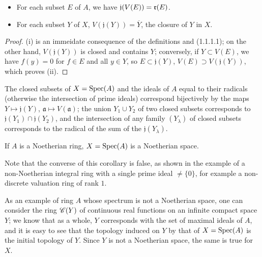\begin{prop}[1.1.4]
\label{prop-1.1.1.4}
\medskip\noindent
\begin{itemize}
  \item[{\rm(i)}] For each subset $E$ of $A$, we have $\mathfrak{j}(V(E))=\mathfrak{r}(E)$.
  \item[{\rm(ii)}] For each subset $Y$ of $X$, $V(\mathfrak{j}(Y))=\overline{Y}$, the closure of $Y$
        in $X$.
\end{itemize}
\end{prop}

\begin{proof}
\label{proof-prop-1.1.1.4}
(i) is an immeidate consequence of the definitions and (1.1.1.1); on the other hand,
$V(\mathfrak{j}(Y))$ is closed and contains $Y$; conversely, if $Y\subset V(E)$, we have
$f(y)=0$ for $f\in E$ and all $y\in Y$, so $E\subset\mathfrak{j}(Y)$,
$V(E)\supset V(\mathfrak{j}(Y))$, which proves (ii).
\end{proof}

\begin{cor}[1.1.5]
\label{cor-1.1.1.5}
The closed subsets of $X={\mathop{\mathrm{Spec}}\nolimits}(A)$ and the ideals of $A$ equal to their radicals (otherwise
the intersection of prime ideals) correspond bijectively by the  maps
$Y\mapsto\mathfrak{j}(Y)$, $\mathfrak{a}\mapsto V(\mathfrak{a})$; the union $Y_1\cup Y_2$ of
two closed subsets corresponds to $\mathfrak{j}(Y_1)\cap\mathfrak{j}(Y_2)$, and the
intersection of any family $(Y_\lambda)$ of closed subsets corresponds to the radical of the
sum of the $\mathfrak{j}(Y_\lambda)$.
\end{cor}

\begin{cor}[1.1.6]
\label{cor-1.1.1.6}
If $A$ is a Noetherian ring, $X={\mathop{\mathrm{Spec}}\nolimits}(A)$ is a Noetherian space.
\end{cor}

Note that the converse of this corollary is false, as shown
in the example of a non-Noetherian integral ring with a single prime ideal $\neq\{0\}$, for
example a non-discrete valuation ring of rank $1$.

As an example of ring $A$ whose spectrum is not a Noetherian space, one can consider the ring
$\mathscr{C}(Y)$ of continuous real functions on an infinite compact space $Y$; we know that as a
whole, $Y$ corresponds with the set of maximal ideals of $A$, and it is easy to see that the
topology induced on $Y$ by that of $X={\mathop{\mathrm{Spec}}\nolimits}(A)$ is the initial topology of $Y$. Since $Y$ is
not a Noetherian space, the same is true for $X$.

